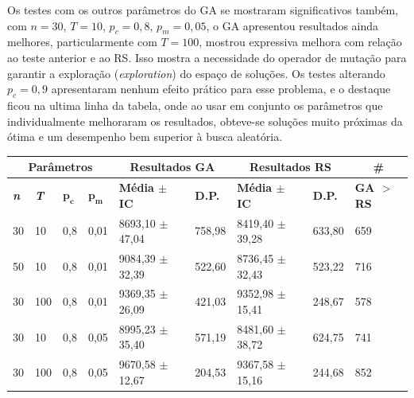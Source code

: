 Os testes com os outros parâmetros do GA se mostraram significativos também, com \(n = 30\), \(T = 10\), \(p_c = 0,8\), \(p_m = 0,05\), o GA apresentou resultados ainda melhores, particularmente com \(T=100\), mostrou expressiva melhora com relação ao teste anterior e ao RS. Isso mostra a necessidade do operador de mutação para garantir a exploração (\textit{exploration}) do espaço de soluções. Os testes alterando \(p_c = 0,9\) apresentaram nenhum efeito prático para esse problema, e o destaque ficou na ultima linha da tabela, onde ao usar em conjunto os parâmetros que individualmente melhoraram os resultados, obteve-se soluções muito próximas da ótima e um desempenho bem superior à busca aleatória.

\begin{table}[h]
	\begin{tabular}{|l|l|l|l|l|l|l|l|l|}
		\hline
		\multicolumn{4}{|c|}{\textbf{Parâmetros}} & \multicolumn{2}{c|}{\textbf{Resultados GA}} & \multicolumn{2}{c|}{\textbf{Resultados RS}} & \multicolumn{1}{c|}{\textbf{\#}} \\ \hline
		\textbf{\textit{n}}     & \textbf{\textit{T}}      & $\bm{p_c}$   & $\bm{p_m}$   & \textbf{Média $\pm$ IC}            & \textbf{D.P.}       & \textbf{Média $\pm$ IC}              & \textbf{D.P.}           & \textbf{GA $>$ RS}                                                               \\ \hline
		30    & 10     & 0,8	& 0,01    & 8693,10 $\pm$ 47,04     & 758,98    & 8419,40 $\pm$ 39,28       & 633,80        & 659                                                            \\ \hline
		50    & 10     & 0,8	& 0,01    & 9084,39 $\pm$ 32,39     & 522,60    & 8736,45 $\pm$ 32,43       & 523,22        & 716                                                            \\ \hline
		30    & 100    & 0,8	& 0,01    & 9369,35 $\pm$ 26,09     & 421,03    & 9352,98 $\pm$ 15,41       & 248,67        & 578                                                            \\ \hline
		30    & 10     & 0,8	& 0,05    & 8995,23 $\pm$ 35,40     & 571,19    & 8481,60 $\pm$ 38,72       & 624,75        & 741                                                            \\ \hline
		30    & 100    & 0,8	& 0,05    & 9670,58 $\pm$ 12,67     & 204,53    & 9367,58 $\pm$ 15,16       & 244,68        & 852                                                            \\ \hline

\end{tabular}
\end{table}

